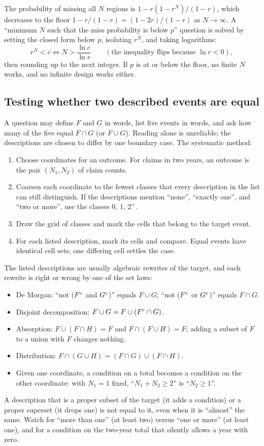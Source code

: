 The probability of missing all $N$ regions is $1 - r(1 - r^N)/(1-r)$, which decreases
to the floor $1 - r/(1-r) = (1 - 2r)/(1-r)$ as $N \to \infty$. A ``minimum $N$ such
that the miss probability is below $p$'' question is solved by setting the closed
form below $p$, isolating $r^N$, and taking logarithms:
\[
  r^N < c \iff N > \frac{\ln c}{\ln r}
  \qquad (\text{the inequality flips because } \ln r < 0),
\]
then rounding up to the next integer. If $p$ is at or below the floor, no finite
$N$ works, and no infinite design works either.

\subsection{Testing whether two described events are equal}

A question may define $F$ and $G$ in words, list five events in words, and ask how
many of the five equal $F \cap G$ (or $F \cup G$). Reading alone is unreliable; the
descriptions are chosen to differ by one boundary case. The systematic method:
\begin{enumerate}[nosep]
  \item Choose coordinates for an outcome. For claims in two years, an outcome is
        the pair $(N_1, N_2)$ of claim counts.
  \item Coarsen each coordinate to the fewest classes that every description in the
        list can still distinguish. If the descriptions mention ``none'', ``exactly
        one'', and ``two or more'', use the classes $0$, $1$, $2^{+}$.
  \item Draw the grid of classes and mark the cells that belong to the target event.
  \item For each listed description, mark its cells and compare. Equal events have
        identical cell sets; one differing cell settles the case.
\end{enumerate}
The listed descriptions are usually algebraic rewrites of the target, and each
rewrite is right or wrong by one of the set laws:
\begin{itemize}[nosep]
  \item De Morgan: ``not ($F^{\mathrm{c}}$ and $G^{\mathrm{c}}$)'' equals $F \cup G$; ``not
        ($F^{\mathrm{c}}$ or $G^{\mathrm{c}}$)'' equals $F \cap G$.
  \item Disjoint decomposition: $F \cup G = F \cup (F^{\mathrm{c}} \cap G)$.
  \item Absorption: $F \cup (F \cap H) = F$ and $F \cap (F \cup H) = F$; adding a
        subset of $F$ to a union with $F$ changes nothing.
  \item Distribution: $F \cap (G \cup H) = (F\cap G) \cup (F \cap H)$.
  \item Given one coordinate, a condition on a total becomes a condition on the
        other coordinate: with $N_1 = 1$ fixed, ``$N_1 + N_2 \ge 2$'' is
        ``$N_2 \ge 1$''.
\end{itemize}
A description that is a proper subset of the target (it adds a condition) or a
proper superset (it drops one) is not equal to it, even when it is ``almost'' the
same. Watch for ``more than one'' (at least two) versus ``one or more'' (at least one),
and for a condition on the two-year total that silently allows a year with zero.

